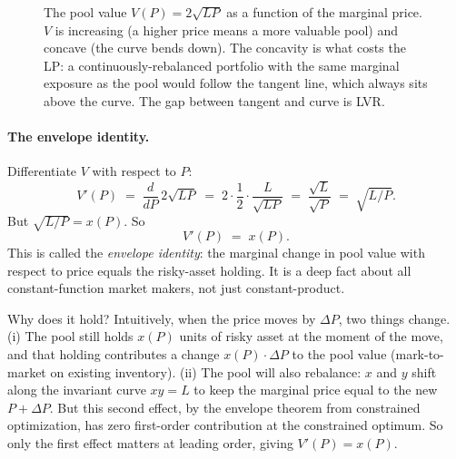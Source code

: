 \documentclass[11pt]{article}
\theoremstyle{definition}
\theoremstyle{remark}
\newcommand{\1}{\mathbf{1}}
\begin{document}
\begin{figure}[h]
\centering
{}
\caption{The pool value $V(P) = 2\sqrt{LP}$ as a function of the marginal price. $V$ is increasing (a higher price means a more valuable pool) and concave (the curve bends down). The concavity is what costs the LP: a continuously-rebalanced portfolio with the same marginal exposure as the pool would follow the tangent line, which always sits above the curve. The gap between tangent and curve is LVR.}
\label{fig:Vcurve}
\end{figure}

\paragraph{The envelope identity.}
Differentiate $V$ with respect to $P$:
\[
V'(P) \;=\; \frac{d}{dP}\,2\sqrt{LP} \;=\; 2 \cdot \frac{1}{2} \cdot \frac{L}{\sqrt{LP}} \;=\; \frac{\sqrt{L}}{\sqrt{P}} \;=\; \sqrt{L/P}.
\]
But $\sqrt{L/P} = x(P)$. So
\begin{equation}\label{eq:envelope}
\boxed{V'(P) \;=\; x(P).}
\end{equation}
This is called the \emph{envelope identity}: the marginal change in pool value with respect to price equals the risky-asset holding. It is a deep fact about all constant-function market makers, not just constant-product.

Why does it hold? Intuitively, when the price moves by $\Delta P$, two things change. (i) The pool still holds $x(P)$ units of risky asset at the moment of the move, and that holding contributes a change $x(P) \cdot \Delta P$ to the pool value (mark-to-market on existing inventory). (ii) The pool will also rebalance: $x$ and $y$ shift along the invariant curve $xy = L$ to keep the marginal price equal to the new $P + \Delta P$. But this second effect, by the envelope theorem from constrained optimization, has zero first-order contribution at the constrained optimum. So only the first effect matters at leading order, giving $V'(P) = x(P)$.
\end{document}
